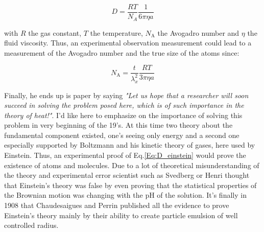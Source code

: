 \begin{equation}
	D = \frac{R T}{N_A}\frac{1}{6\pi \eta a}
	\label{Eq:D_einstein}
\end{equation}


with $R$ the gas constant, $T$ the temperature, $N_\mathrm{A}$ the Avogadro number and $\eta$ the fluid viscosity. Thus, an experimental observation measurement could lead to a measurement of the Avogadro number and the true size of the atoms since:

\begin{equation}
	N_\mathrm{A} = \frac{t}{\lambda_x^2} \frac{RT}{3\pi \eta a}
\end{equation}

Finally, he ends up is paper \cite{einstein_uber_1905} by saying \textit{"Let us hope that a researcher will soon succeed in solving the problem posed here, which is of such importance in the theory of heat!"}. I'd like here to emphasize on the importance of solving this problem in very beginning of the 19's. At this time two theory about the fundamental component existed, one's seeing only energy and a second one especially supported by Boltzmann and his kinetic theory of gases, here used by Einstein. Thus, an experimental proof of Eq.\ref{Eq:D_einstein} would prove the existence of atoms and molecules. Due to a lot of theoretical misunderstanding of the theory and experimental error scientist such as Svedberg or Henri thought that Einstein's theory was false \cite{genthon_concept_2020} by even proving that the statistical properties of the Brownian motion was changing with the pH of the solution. It's finally in 1908 that Chaudesaigues and Perrin published all the evidence to prove Einstein's theory mainly by their ability to create particle emulsion of well controlled radius. 

